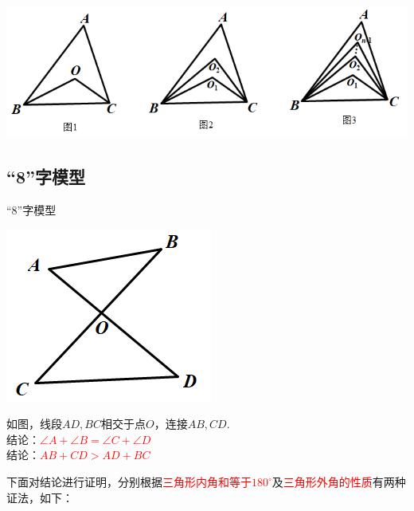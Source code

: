 \documentclass[10pt]{ctexart}
\begin{document}
 \includegraphics[scale=0.6]{figure/feibiao08.PNG}


\subsection{“8”字模型}

\begin{custom}[explorecolor]{“8”字模型}
\begin{minipage}{0.3\textwidth}
 \includegraphics[scale=0.3]{figure/bazhi01.PNG}
\end{minipage}
\begin{minipage}{0.6\textwidth}
如图，线段$AD,BC$相交于点$O$，连接$AB,CD$.\\
结论：\textcolor{red}{$\angle A+\angle B=\angle C+\angle D$}\\
结论：\textcolor{red}{$AB+CD>AD+BC$}
\end{minipage}
\end{custom}
下面对结论进行证明，分别根据\textcolor{red}{三角形内角和等于$180^\circ$}及\textcolor{red}{三角形外角的性质}有两种证法，如下：

\begin{minipage}{0.5\textwidth}
\kaishu{}
\end{minipage}
\begin{minipage}{0.5\textwidth}
\kaishu{}
\end{minipage}
\end{document}
